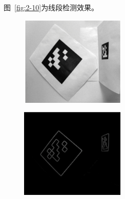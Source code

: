 图~\ref{fig:2-10}为线段检测效果。

\begin{figure}[htb]
	\begin{minipage}[t]{0.33\linewidth}
		\centering
		\includegraphics[width=\columnwidth]{figures/2-10a.png} 
		\label{fig:2-10a} 
	\end{minipage}
	\begin{minipage}[t]{0.33\linewidth} 
		\centering
		\includegraphics[width=\columnwidth]{figures/2-10b.png} 

\end{minipage}
\end{figure}
